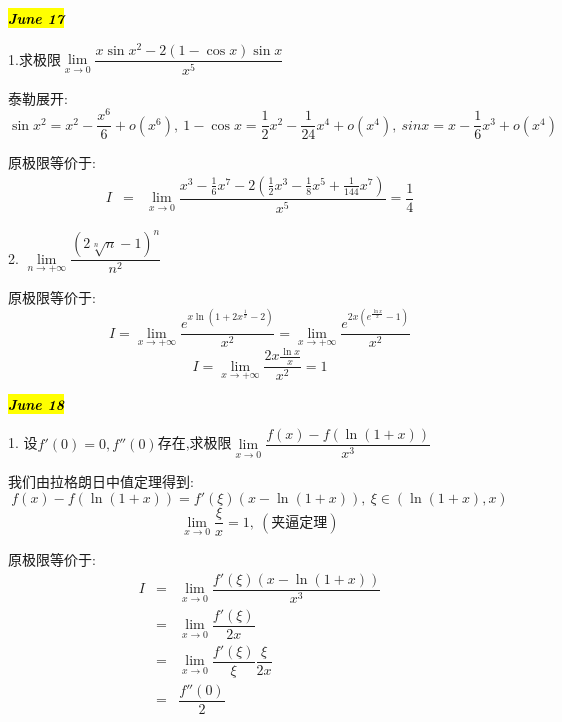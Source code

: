 
\hl{\textbf{\textit{June 17}}}

1.求极限$\lim\limits_{x\rightarrow 0 }\dfrac{x\sin x^2-2(1-\cos x)\sin x}{x^5}$
\begin{solution}
	
	泰勒展开: 
	$$\sin x^2=x^2-\dfrac{x^6}{6}+o(x^6),\ 1-\cos x=\dfrac{1}{2}x^2-\dfrac{1}{24}x^4+o(x^4),\ sin x=x-\dfrac{1}{6}x^3+o(x^4)$$
	
	原极限等价于: 
	\begin{eqnarray*}
		I&=&\lim\limits_{x\rightarrow 0}\dfrac{x^3-\frac{1}{6}x^7-2(\frac{1}{2}x^3-\frac{1}{8}x^5+\frac{1}{144}x^7)}{x^5}=\dfrac{1}{4}
	\end{eqnarray*}
\end{solution}

2. $\lim\limits_{n\rightarrow +\infty}\dfrac{(2\sqrt[n]{n}-1)^n}{n^2}$
\begin{solution}
	
	原极限等价于: 
	$$I=\lim\limits_{x\rightarrow +\infty}\dfrac{e^{x\ln(1+2x^{\frac{1}{x}}-2)}}{x^2}=\lim\limits_{x\rightarrow +\infty}\dfrac{e^{2x(e^{\frac{\ln x}{x}}-1)}}{x^2}$$
	$$I=\lim\limits_{x\rightarrow +\infty}\dfrac{2x\frac{\ln x}{x}}{x^2}=1$$
\end{solution}


\hl{\textbf{\textit{June 18}}}

1. 设$f'(0)=0,f''(0)$存在,求极限$\lim\limits_{x\rightarrow 0}\dfrac{f(x)-f(\ln(1+x))}{x^3}$
\begin{solution}
	
	我们由拉格朗日中值定理得到: 
	$$f(x)-f(\ln(1+x))=f'(\xi)(x-\ln(1+x)),\ \xi\in(\ln(1+x),x)$$
	$$\lim\limits_{x\rightarrow 0}\dfrac{\xi}{x}=1,\ (\text{夹逼定理})$$
	
	原极限等价于: 
	\begin{eqnarray*}
		I&=&\lim\limits_{x\rightarrow 0}\dfrac{f'(\xi)(x-\ln(1+x))}{x^3}\\
		&=&\lim\limits_{x\rightarrow 0}\dfrac{f'(\xi)}{2x}\\
		&=&\lim\limits_{x\rightarrow 0}\dfrac{f'(\xi)}{\xi}\dfrac{\xi}{2x}\\
		&=&\dfrac{f''(0)}{2}
	\end{eqnarray*}
\end{solution}


